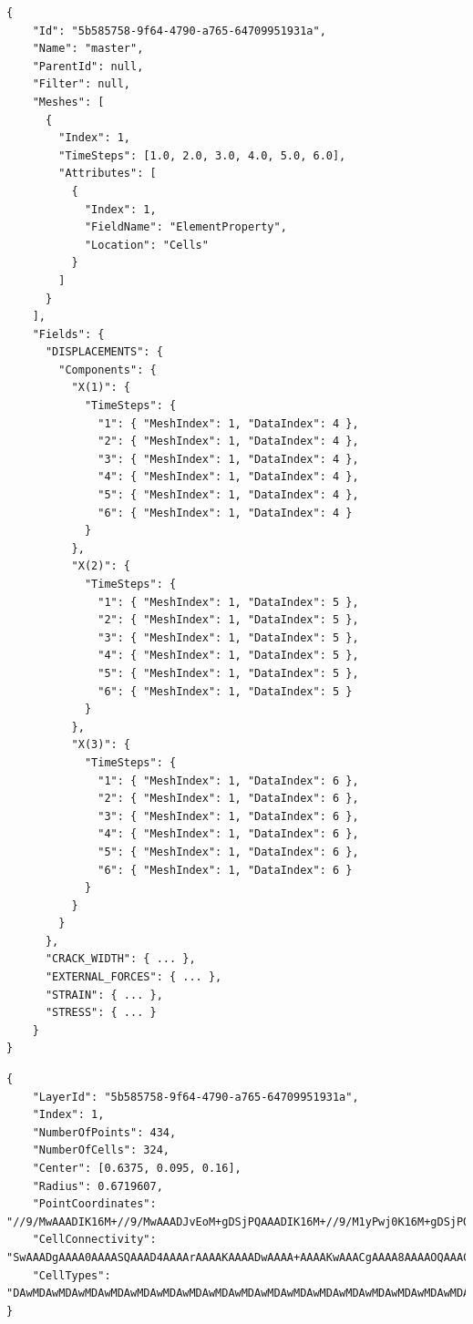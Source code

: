 \pagebreak

\begin{lstlisting}[style=json,caption=Example of summary.json document.,label=lst:summary.json]
{
    "Id": "5b585758-9f64-4790-a765-64709951931a",
    "Name": "master",
    "ParentId": null,
    "Filter": null,
    "Meshes": [
      {
        "Index": 1,
        "TimeSteps": [1.0, 2.0, 3.0, 4.0, 5.0, 6.0],
        "Attributes": [
          {
            "Index": 1,
            "FieldName": "ElementProperty",
            "Location": "Cells"
          }
        ]
      }
    ],
    "Fields": {
      "DISPLACEMENTS": {
        "Components": {
          "X(1)": {
            "TimeSteps": {
              "1": { "MeshIndex": 1, "DataIndex": 4 },
              "2": { "MeshIndex": 1, "DataIndex": 4 },
              "3": { "MeshIndex": 1, "DataIndex": 4 },
              "4": { "MeshIndex": 1, "DataIndex": 4 },
              "5": { "MeshIndex": 1, "DataIndex": 4 },
              "6": { "MeshIndex": 1, "DataIndex": 4 }
            }
          },
          "X(2)": {
            "TimeSteps": {
              "1": { "MeshIndex": 1, "DataIndex": 5 },
              "2": { "MeshIndex": 1, "DataIndex": 5 },
              "3": { "MeshIndex": 1, "DataIndex": 5 },
              "4": { "MeshIndex": 1, "DataIndex": 5 },
              "5": { "MeshIndex": 1, "DataIndex": 5 },
              "6": { "MeshIndex": 1, "DataIndex": 5 }
            }
          },
          "X(3)": {
            "TimeSteps": {
              "1": { "MeshIndex": 1, "DataIndex": 6 },
              "2": { "MeshIndex": 1, "DataIndex": 6 },
              "3": { "MeshIndex": 1, "DataIndex": 6 },
              "4": { "MeshIndex": 1, "DataIndex": 6 },
              "5": { "MeshIndex": 1, "DataIndex": 6 },
              "6": { "MeshIndex": 1, "DataIndex": 6 }
            }
          }
        }
      },
      "CRACK_WIDTH": { ... },
      "EXTERNAL_FORCES": { ... },
      "STRAIN": { ... },
      "STRESS": { ... }
    }
}
\end{lstlisting}

\begin{lstlisting}[style=json,caption=Example of mesh.json document.,label=lst:mesh.json]
{
    "LayerId": "5b585758-9f64-4790-a765-64709951931a",
    "Index": 1,
    "NumberOfPoints": 434,
    "NumberOfCells": 324,
    "Center": [0.6375, 0.095, 0.16],
    "Radius": 0.6719607,
    "PointCoordinates": "//9/MwAAADIK16M+//9/MwAAADJvEoM+gDSjPQAAADIK16M+//9/M1yPwj0K16M+gDSjPQAAAD...",
    "CellConnectivity": "SwAAADgAAAA0AAAASQAAAD4AAAArAAAAKAAAADwAAAA+AAAAKwAAACgAAAA8AAAAOQAAACUAAA...",
    "CellTypes": "DAwMDAwMDAwMDAwMDAwMDAwMDAwMDAwMDAwMDAwMDAwMDAwMDAwMDAwMDAwMDAwMDAwMDAwMDAwMDAwMD..."
}
\end{lstlisting}


